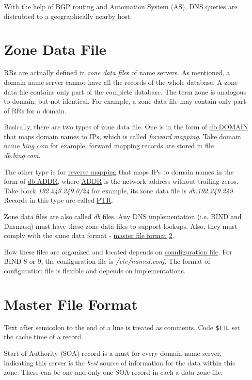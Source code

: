 With the help of BGP routing and Automation System (AS), DNS
queries are distrubted to a geographically nearby host.

\section{Zone Data File}
\label{sec:zone-data-file}

RRs are actually defined in \textit{zone data file}s of name
servers. As mentioned, a domain name server cannot have all the
records of the whole database. A zone data file contains only part
of the complete database. The term zone is analogous to domain,
but not identical. For example, a zone data file may contain only
part of RRs for a domain.

Basically, there are two types of zone data file. One is in the
form of \uline{db.DOMAIN} that maps domain names to IPs, which is
called \textit{forward mapping}. Take domain name
\textit{bing.com} for example, forward mapping records are stored
in file \textit{db.bing.com}.

The other type is for \uline{reverse mapping} that maps IPs to
domain names in the form of \uline{db.ADDR}, where \uline{ADDR} is
the network address without trailing zeros. Take block
\textit{192.249.249.0/24} for example, its zone data file is
\textit{db.192.249.249}. Records in this type are called
\href{https://en.wikipedia.org/wiki/Reverse_DNS_lookup}{PTR}.

Zone data files are also called \textit{db} files. Any DNS
implementation (i.e. BIND and Dnsmasq) must have these zone data
files to support lookups. Also, they must comply with the same
data format - \uline{master file format}
\ref{sec:master-file-format}.

How these files are organized and located depends on
\uline{connfiguration file}. For BIND 8 or 9, the configuration
file is \textit{/etc/named.conf}. The format of configuration file
is flexible and depends on implementations.

\section{Master File Format}
\label{sec:master-file-format}

Text after semicolon to the end of a line is treated as
comments. Code \verb|$TTL| set the cache time of a record.

Start of Authority (SOA) record is a must for every domain name
server, indicating this server is the \textit{best} source of
information for the data within this zone. There can be one and
only one SOA record in each a data zone file.

